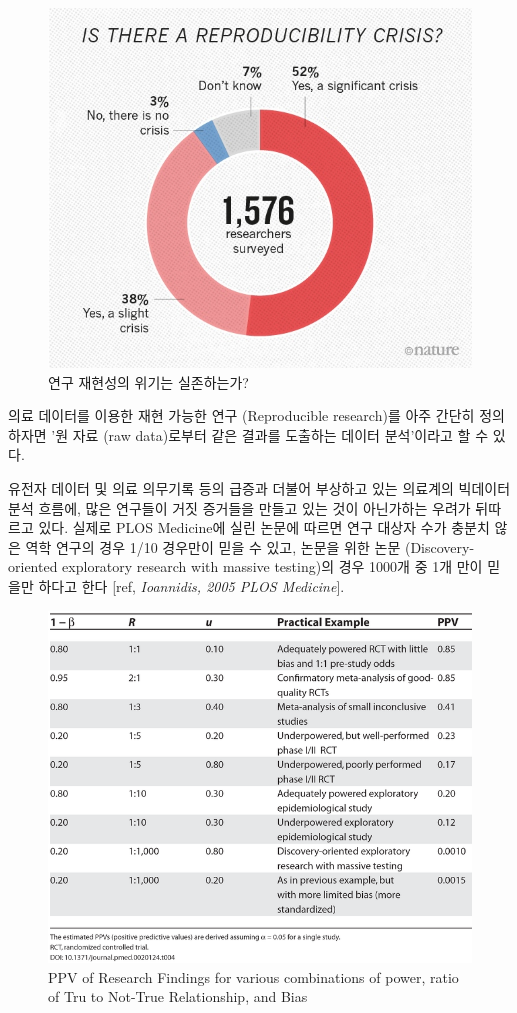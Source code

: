 \documentclass[]{book}
\begin{document}
\begin{figure}
\includegraphics[width=0.8\linewidth]{images/OhdsiCommunity/reproducibility-graphic-online1} \caption{연구 재현성의 위기는 실존하는가?}\label{fig:isThereAReproducibilityCrisis}
\end{figure}

의료 데이터를 이용한 재현 가능한 연구 (Reproducible research)를 아주 간단히 정의하자면 '원 자료 (raw data)로부터 같은 결과를 도출하는 데이터 분석'이라고 할 수 있다.

유전자 데이터 및 의료 의무기록 등의 급증과 더불어 부상하고 있는 의료계의 빅데이터 분석 흐름에, 많은 연구들이 거짓 증거들을 만들고 있는 것이 아닌가하는 우려가 뒤따르고 있다. 실제로 PLOS Medicine에 실린 논문에 따르면 연구 대상자 수가 충분치 않은 역학 연구의 경우 1/10 경우만이 믿을 수 있고, 논문을 위한 논문 (Discovery-oriented exploratory research with massive testing)의 경우 1000개 중 1개 만이 믿을만 하다고 한다 {[}ref, \emph{Ioannidis, 2005 PLOS Medicine}{]}.

\begin{figure}
\includegraphics[width=0.8\linewidth]{images/OhdsiCommunity/journal.pmed.0020124.t004} \caption{PPV of Research Findings for various combinations of power, ratio of Tru to Not-True Relationship, and Bias}\label{fig:whyMostPublishedResarchFindingsAreFalse}
\end{figure}
\end{document}
